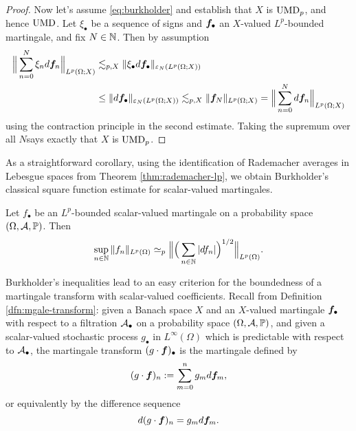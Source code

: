 \begin{proof}
Now let's assume \eqref{eq:burkholder} and establish that $X$ is $\mathrm{UMD}_{p}$, and hence $\mathrm{UMD}$.
Let $\xi_{\bullet}$ be a sequence of signs and $\bm{f}_{\bullet}$ an $X$-valued $L^p$-bounded martingale, and fix $N \in \mathbb{N}$.
Then by assumption
\begin{equation*}
  \begin{aligned}
  \Big\| \sum_{n=0}^{N} \xi_{n} d\bm{f}_{n} \Big\|_{L^p(\Omega;X)}
  &\lesssim_{p,X} \| \xi_{\bullet} d\bm{f}_{\bullet} \|_{\varepsilon_{N}(L^p(\Omega;X))} \\
  &\leq \|d\bm{f}_{\bullet}\|_{\varepsilon_{N}(L^p(\Omega;X))}
  \lesssim_{p,X} \|\bm{f}_{N}\|_{L^p(\Omega;X)} = \Big\| \sum_{n = 0}^{N} d\bm{f}_{n} \Big\|_{L^p(\Omega;X)}
\end{aligned}
\end{equation*}
using the contraction principle in the second estimate.
Taking the supremum over all $N$says exactly that $X$ is $\mathrm{UMD}_{p}$.
\end{proof}

As a straightforward corollary, using the identification of Rademacher averages in Lebesgue spaces from Theorem \ref{thm:rademacher-lp}, we obtain Burkholder's classical square function estimate for scalar-valued martingales.

\begin{cor}
  Let $f_{\bullet}$ be an $L^p$-bounded scalar-valued martingale on a probability space $(\Omega,\mathcal{A},\mathbb{P})$.
  Then
  \begin{equation*}
    \sup_{n \in \mathbb{N}} \|f_{n}\|_{L^p(\Omega)} \simeq_{p} \Big\| \Big( \sum_{n \in \mathbb{N}} |df_{n}| \Big)^{1/2} \Big\|_{L^p(\Omega)}. 
  \end{equation*}
\end{cor}

Burkholder's inequalities lead to an easy criterion for the boundedness of a martingale transform with scalar-valued coefficients.
Recall from Definition \ref{dfn:mgale-transform}: given a Banach space $X$ and an $X$-valued martingale $\bm{f}_{\bullet}$ with respect to a filtration $\mathcal{A}_{\bullet}$ on a probability space $(\Omega,\mathcal{A},\mathbb{P})$, and given a scalar-valued stochastic process $g_{\bullet}$ in $L^\infty(\Omega)$ which is predictable with respect to $\mathcal{A}_{\bullet}$,
the martingale transform $(g \cdot \bm{f})_{\bullet}$ is the martingale defined by
\begin{equation*}
  (g \cdot \bm{f})_n := \sum_{m=0}^n g_m d\bm{f}_m,
\end{equation*}
or equivalently by the difference sequence
\begin{equation*}
  d(g \cdot \bm{f})_{n} = g_{m} d\bm{f}_{m}.
\end{equation*}

